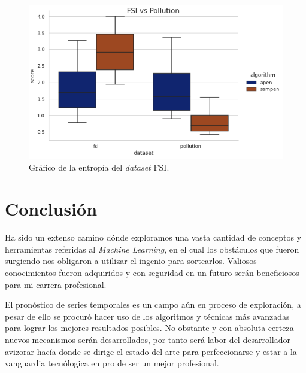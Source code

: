 \documentclass[a4paper,12pt]{article}
\begin{document}
\begin{figure}[H]
	\begin{center}
	\includegraphics[width=1\textwidth]{fsi_vs_pollution.png}
  	\caption{Gráfico de la entropía del \textit{dataset} FSI.}
  	\label{fig:en_fsi}
  	\end{center}
\end{figure}

\clearpage

\section{Conclusión}
Ha sido un extenso camino dónde exploramos una vasta cantidad de conceptos y herramientas referidas al \textit{Machine Learning}, en el cual los obstáculos que fueron surgiendo nos obligaron a utilizar el ingenio para sortearlos. Valiosos conocimientos fueron adquiridos y con seguridad en un futuro serán beneficiosos para mi carrera profesional.

El pronóstico de series temporales es un campo aún en proceso de exploración, a pesar de ello se procuró hacer uso de los algoritmos y técnicas más avanzadas para lograr los mejores resultados posibles. No obstante y con absoluta certeza nuevos mecanismos serán desarrollados, por tanto será labor del desarrollador avizorar hacía donde se dirige el estado del arte para perfeccionarse y estar a la vanguardia tecnólogica en pro de ser un mejor profesional.

\clearpage

{}

%
%
\end{document}
